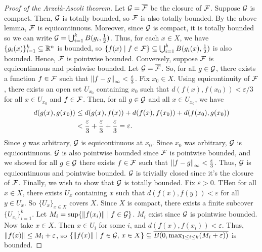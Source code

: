 \begin{proof}[Proof of the Arzelà-Ascoli theorem]
    Let $\mathcal{G} = \overline{\mathcal{F}}$ be the closure of $\mathcal{F}$. Suppose $\mathcal{G}$ is compact. Then, $\mathcal{G}$ is totally bounded, so $\mathcal{F}$ is also totally bounded. By the above lemma, $\mathcal{F}$ is equicontinuous. Moreover, since $\mathcal{G}$ is compact, it is totally bounded so we can write $\mathcal{G} = \bigcup_{i=1}^{k} B(g_{i},\frac{1}{2})$. Thus, for each $x \in X$, we have $\{g_{i}(x)\}_{i=1}^{k} \subseteq \mathbb{R}^{n}$ is bounded, so $\{f(x) \mid f \in \mathcal{F}\} \subseteq \bigcup_{i=1}^{k} B(g_{i}(x),\frac{1}{2})$ is also bounded. Hence, $\mathcal{F}$ is pointwise bounded. Conversely, suppose $\mathcal{F}$ is equicontinuous and pointwise bounded. Let $\mathcal{G} = \overline{\mathcal{F}}$. So, for all $g \in \mathcal{G}$, there exists a function $f \in \mathcal{F}$ such that $\left\lVert f-g\right\rVert_{\infty} < \frac{\varepsilon}{3}$. Fix $x_{0} \in X$. Using equicontinuity of $\mathcal{F}$, there exists an open set $U_{x_{0}}$ containing $x_{0}$ such that $d(f(x),f(x_{0})) < \varepsilon/3$ for all $x \in U_{x_{0}}$ and $f \in \mathcal{F}$. Then, for all $g \in \mathcal{G}$ and all $x \in U_{x_{0}}$, we have
    \begin{align}
        d(g(x),g(x_{0})) &\leq d(g(x),f(x)) + d(f(x),f(x_{0})) + d(f(x_{0}),g(x_{0})) \notag\\
        &< \frac{\varepsilon}{3} + \frac{\varepsilon}{3} + \frac{\varepsilon}{3} = \varepsilon.
    \end{align}
    Since $g$ was arbitrary, $\mathcal{G}$ is equicontinuous at $x_{0}$. Since $x_{0}$ was arbitrary, $\mathcal{G}$ is equicontinuous. $\mathcal{G}$ is also pointwise bounded since $\mathcal{F}$ is pointwise bounded, and we showed for all $g \in \mathcal{G}$ there exists $f \in \mathcal{F}$ such that $\left\lVert f-g\right\rVert_{\infty} < \frac{\varepsilon}{3}$. Thus, $\mathcal{G}$ is equicontinuous and pointwise bounded. $\mathcal{G}$ is trivially closed since it's the closure of $\mathcal{F}$. Finally, we wish to show that $\mathcal{G}$ is totally bounded. Fix $\varepsilon > 0$. THen for all $x \in X$, there exists $U_{x}$ containing $x$ such that $d(f(x),f(y)) < \varepsilon$ for all $y \in U_{x}$. So $\{U_{x}\}_{x \in X}$ covers $X$. Since $X$ is compact, there exists a finite subcover $\{U_{x_{i}}\}_{i=1}^{k}$. Let $M_{i} = \sup \{\left\lVert f(x_{i})\right\rVert \mid f \in \mathcal{G}\}$. $M_{i}$ exist since $\mathcal{G}$ is pointwise bounded. Now take $x \in X$. Then $x \in U_{i}$ for some $i$, and $d(f(x),f(x_{i})) < \varepsilon$. Thus, $\left\lVert f(x)\right\rVert \leq M_{i} + \varepsilon$, so $\{\left\lVert f(x)\right\rVert \mid f \in \mathcal{G}, \, x \in X\} \subseteq \overline{B(0,\max_{1 \leq i \leq k} (M_{i} + \varepsilon))}$ is bounded.


\end{proof}
